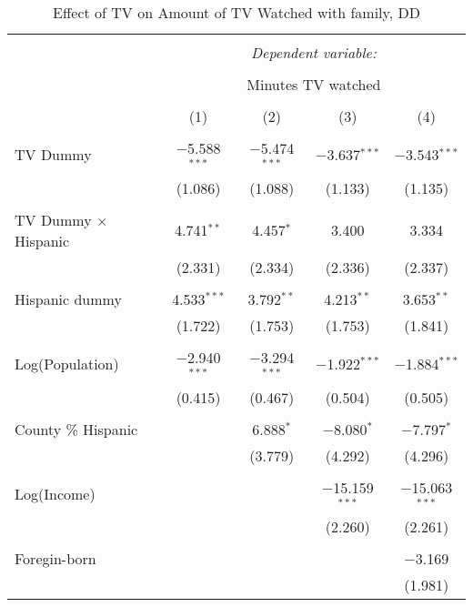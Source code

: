 
\begin{table}[!htbp] \centering 
  \caption{Effect of TV on Amount of TV Watched with family, DD} 
  \label{} 
\begin{tabular}{@{\extracolsep{-5pt}}lcccc} 
\\[-1.8ex]\hline 
\hline \\[-1.8ex] 
 & \multicolumn{4}{c}{\textit{Dependent variable:}} \\ 
\cline{2-5} 
\\[-1.8ex] & \multicolumn{4}{c}{Minutes TV watched} \\ 
\\[-1.8ex] & (1) & (2) & (3) & (4)\\ 
\hline \\[-1.8ex] 
 TV Dummy & $-$5.588$^{***}$ & $-$5.474$^{***}$ & $-$3.637$^{***}$ & $-$3.543$^{***}$ \\ 
  & (1.086) & (1.088) & (1.133) & (1.135) \\ 
  & & & & \\ 
 TV Dummy $\times$ Hispanic  & 4.741$^{**}$ & 4.457$^{*}$ & 3.400 & 3.334 \\ 
  & (2.331) & (2.334) & (2.336) & (2.337) \\ 
  & & & & \\ 
 Hispanic dummy & 4.533$^{***}$ & 3.792$^{**}$ & 4.213$^{**}$ & 3.653$^{**}$ \\ 
  & (1.722) & (1.753) & (1.753) & (1.841) \\ 
  & & & & \\ 
 Log(Population) & $-$2.940$^{***}$ & $-$3.294$^{***}$ & $-$1.922$^{***}$ & $-$1.884$^{***}$ \\ 
  & (0.415) & (0.467) & (0.504) & (0.505) \\ 
  & & & & \\ 
 County \% Hispanic &  & 6.888$^{*}$ & $-$8.080$^{*}$ & $-$7.797$^{*}$ \\ 
  &  & (3.779) & (4.292) & (4.296) \\ 
  & & & & \\ 
 Log(Income) &  &  & $-$15.159$^{***}$ & $-$15.063$^{***}$ \\ 
  &  &  & (2.260) & (2.261) \\ 
  & & & & \\ 
 Foregin-born &  &  &  & $-$3.169 \\ 
  &  &  &  & (1.981) \\ 

\end{tabular}
\end{table}
